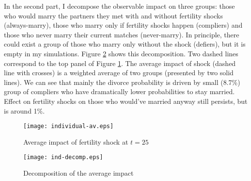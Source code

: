 \documentclass[12pt,letter]{article}
\begin{document}
In the second part, I decompose the observable impact on three groups: those who would marry the partners they met with and without fertility shocks (always-marry), those who marry only if fertility shocks happen (compliers) and those who never marry their current matches (never-marry). In principle, there could exist a group of those who marry only without the shock (defiers), but it is empty in my simulations. Figure \ref{ind-decomp} shows this decomposition. Two dashed lines correspond to the top panel of Figure \ref{individual-av}. The average impact of shock (dashed line with crosses) is a weighted average of two groups (presented by two solid lines). We can see that mainly the divorce probability is driven by small (8.7\%) group of compliers who have dramatically lower probabilities to stay married. Effect on fertility shocks on those who would've married anyway still persists, but is around 1\%. %


\begin{figure}[h!]
\centering
\texttt{[image: individual-av.eps]}
\vspace{-3em}
\caption{Average impact of fertility shock at $t=25$\label{individual-av}}
\end{figure}

\begin{figure}[h!]
\centering
\texttt{[image: ind-decomp.eps]}
\vspace{-0.5em}
\caption{Decomposition of the average impact\label{ind-decomp}}
\end{figure}
\end{document}
